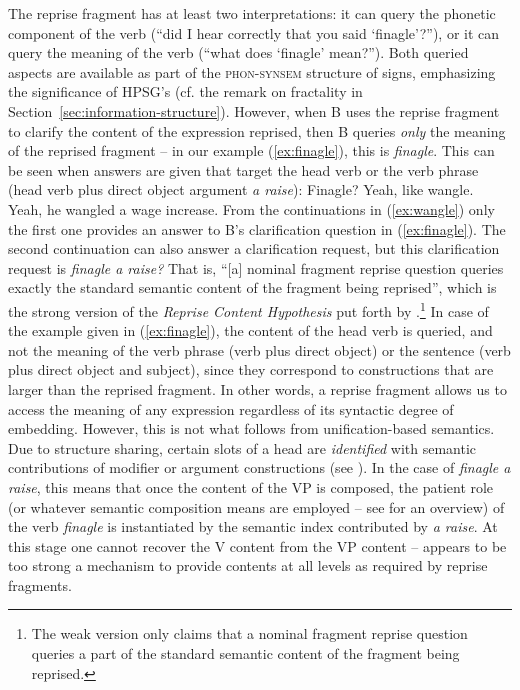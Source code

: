 \documentclass[output=paper
	        ,collection
	        ,collectionchapter
 	        ,biblatex
                ,babelshorthands
                ,newtxmath
                ,draftmode
                ,colorlinks, citecolor=brown
]{langscibook}
\begin{document}
The reprise fragment has at least two interpretations: it can query the phonetic component of the verb (\enquote{did I hear correctly that you said \enquote{finagle}?}), or it can query the meaning of the verb (\enquote{what does \enquote{finagle} mean?}).
%
Both queried aspects are available as part of the \textsc{phon-synsem} structure of signs, emphasizing the significance of HPSG's   (cf. the remark on fractality in Section~\ref{sec:information-structure}).
%
However, when B uses the reprise fragment to clarify the content of the expression reprised, then B queries \emph{only} the meaning of the reprised fragment \citep{Purver:Ginzburg:2004,Ginzburg:Purver:2012} -- in our example (\ref{ex:finagle}), this is \textit{finagle}.
%
This can be seen when answers are given that target the head verb or the verb phrase (head verb plus direct object argument \textit{a raise}):
%
\ea \label{ex:wangle} Finagle?
 \ea Yeah, like wangle.
 \ex Yeah, he wangled a wage increase.
 \z 
\z
%
From the continuations in (\ref{ex:wangle}) only the first one provides an answer to B's clarification question in (\ref{ex:finagle}).
%
The second continuation can also answer a clarification request, but this clarification request is \textit{finagle a raise?}
%
That is, \enquote{[a] nominal fragment reprise question queries exactly the standard semantic content of the fragment being reprised}, which is the strong version of the \emph{Reprise Content Hypothesis}  put forth by \citet[]{Purver:Ginzburg:2004}.\footnote{The weak version \citep[]{Purver:Ginzburg:2004} only claims that a nominal fragment reprise question queries a part of the standard semantic content of the fragment being reprised.}
%
In case of the example given in (\ref{ex:finagle}), the content of the head verb is queried, and not the meaning of the verb phrase (verb plus direct object) or the sentence (verb plus direct object and subject), since they correspond to constructions that are larger than the reprised fragment. 
%
In other words, a reprise fragment allows us to access the meaning of any expression regardless of its syntactic degree of embedding. 
%
However, this is not what follows from unification-based semantics.
%
Due to structure sharing, certain slots of a head are \emph{identified} with semantic contributions of modifier or argument constructions (see  ).
%
In the case of \textit{finagle a raise}, this means that once the content of the VP is composed, the patient role (or whatever semantic composition means are employed -- see  for an overview) of the verb \textit{finagle} is instantiated by the semantic index contributed by \textit{a raise}.
%
At this stage one cannot recover the V content from the VP content --  appears to be too strong a mechanism to provide contents at all levels as required by reprise fragments. 
\end{document}
